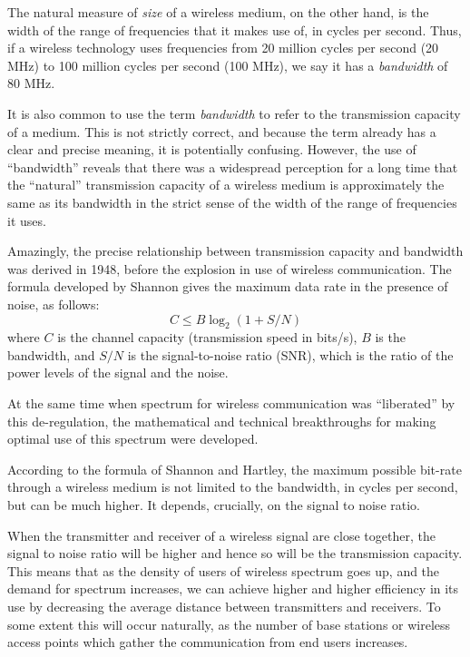 The natural measure of {\em size} of a wireless medium, on the other hand, is the
width of the range of frequencies that it makes use of, in cycles per second. Thus,
if a wireless technology uses frequencies from 20 million cycles per second (20 MHz)
to 100 million cycles per second (100 MHz), we say it has a {\em bandwidth} of
80 MHz.

It is also common to use the term {\em bandwidth} to refer to the transmission capacity of
a medium. This is not strictly correct, and because the term already has a clear and precise
meaning, it is potentially confusing. However, the use of ``bandwidth'' reveals that there
was a widespread perception for a long time that the ``natural'' transmission capacity of 
a wireless medium is approximately the same as its bandwidth in the strict sense of the
width of the range of frequencies it uses. 

Amazingly, the precise relationship between transmission capacity and bandwidth was derived
in 1948, before the explosion in use of wireless communication. The formula developed by 
Shannon gives the maximum data rate in the presence of noise,
as follows:
$$
C \leq B \log_{2} (1 + S/N)
$$
where $C$ is the channel capacity (transmission speed in bits/s), $B$ is the bandwidth, and $S/N$ is the 
signal-to-noise ratio (SNR),
which is the ratio of the power levels of the signal and the noise. 

At the same time when spectrum for wireless communication was ``liberated''
by this de-regulation, the mathematical and technical breakthroughs for making
optimal use of this spectrum were developed. 

According to the formula of Shannon and Hartley, the maximum possible
bit-rate through a wireless medium is not limited to the bandwidth, in cycles per
second, but can be much higher. It depends, crucially, on the signal to noise ratio.

When the transmitter and receiver of a wireless signal are close together, the
signal to noise ratio will be higher and hence so will be the transmission capacity.
This means that as the density of users of wireless spectrum goes up, and the demand for
spectrum increases, we can achieve higher and higher efficiency in its use by 
decreasing the average distance between transmitters and receivers. To some extent
this will occur naturally, as the number of base stations or wireless access points
which gather the communication from end users increases.

